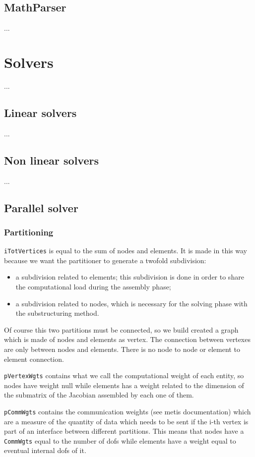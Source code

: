 \documentclass[10pt,dvips]{report}
\begin{document}
\section{MathParser} ...

\chapter{Solvers}
...
\section{Linear solvers}
...
\section{Non linear solvers}
...
\section{Parallel solver}
\subsection{Partitioning}
\texttt{iTotVertices} is equal to the sum of nodes and elements. 
It is made in this way because we want the partitioner 
to generate a twofold subdivision:
\begin{itemize}
\item a subdivision related to elements; 
this subdivision is done in order to share the computational 
load during the assembly phase;
\item a subdivision related to nodes, 
which is necessary for the solving phase with the substructuring method.
\end{itemize}
Of course this two partitions must be connected, 
so we build created a graph which is made of nodes and elements as vertex. 
The connection between vertexes are only between nodes and elements. 
There is no node to node or element to element connection.

\texttt{pVertexWgts} 
contains what we call the computational weight of each entity, 
so nodes have weight null while elements has a weight related to 
the dimension of the submatrix of the Jacobian assembled by each one of them.

\texttt{pCommWgts} contains the communication weights 
(see metis documentation) which are a measure of the quantity 
of data which needs to be sent if the i-th vertex is part 
of an interface between different partitions. 
This means that nodes have a \texttt{CommWgts} equal to the number 
of dofs while elements have a weight equal to eventual internal dofs of it.
\end{document}
